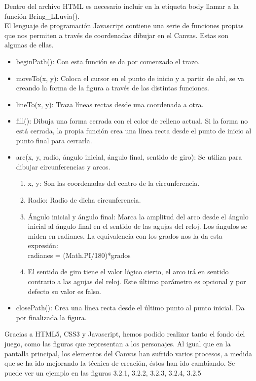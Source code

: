 Dentro del archivo HTML es necesario incluir en la 
etiqueta body llamar a la función Bring\_LLuvia().\\

El lenguaje de programación Javascript contiene una serie de funciones propias que nos permiten  a través de coordenadas dibujar en el Canvas.
Estas son algunas de ellas.

\begin{itemize}
 \item beginPath():  Con esta función se da por comenzado el trazo.
 \item moveTo(x, y): Coloca el cursor en el punto de inicio y a partir de ahí, se va creando la forma de la figura a través de las distintas 
 funciones.
 \item lineTo(x, y): Traza líneas rectas desde una coordenada a otra.
 \item fill(): Dibuja una forma cerrada con el color de relleno actual. Si la forma no está cerrada, la propia función crea una línea recta 
 desde el punto de inicio  al punto final para cerrarla.
 \item arc(x, y, radio, ángulo inicial, ángulo final, sentido de giro):  Se utiliza para dibujar circunferencias y arcos.
 \begin{enumerate}
 \item x, y: Son las coordenadas del centro de la circunferencia.
 \item Radio: Radio de dicha circunferencia.
 \item Ángulo inicial y ángulo final: Marca la amplitud del arco desde el ángulo inicial al ángulo final en el sentido de las agujas del reloj. Los ángulos se miden en radianes. 
 La equivalencia con los grados nos la da esta expresión:\\
 radianes = (Math.PI/180)*grados
 \item El sentido de giro tiene el valor lógico cierto, el arco irá en sentido contrario a las agujas del reloj. Este último parámetro es 
 opcional y por defecto su valor es falso.
 \end{enumerate}
 \item closePath(): Crea una línea recta desde el último punto al punto inicial. Da por finalizada la figura.
\end{itemize}

Gracias a HTML5, CSS3 y Javascript, hemos podido realizar tanto el fondo del juego, como las figuras que representan a los personajes.
Al igual que en la pantalla principal, los elementos del Canvas han sufrido varios procesos, a medida que se ha ido mejorando la técnica de creación, éstos han ido cambiando.
Se puede ver un ejemplo en las figuras 3.2.1, 3.2.2, 3.2.3, 3.2.4, 3.2.5



% 
